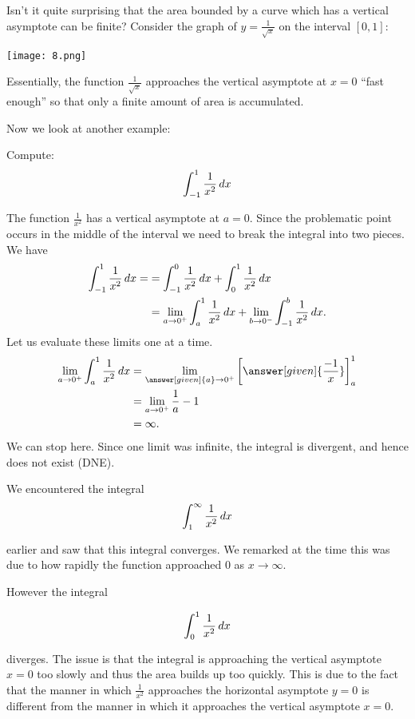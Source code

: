 \documentclass{ximera}
\begin{document}
\begin{example}
\begin{explanation}
Isn't it quite surprising that the area bounded by a curve which has a
vertical asymptote can be finite? Consider the graph of $y=
\frac{1}{\sqrt{x}}$ on the interval $[0,1]$:

\begin{image}
   \texttt{[image: 8.png]}
\end{image}

Essentially, the function $\frac{1}{\sqrt{x}}$ approaches the vertical asymptote at $x=0$ ``fast enough'' so that only a finite amount of area is accumulated. 

  \end{explanation}
\end{example}

Now we look at another example: 

\begin{example}	
  Compute:
  \[
  \int_{-1}^1 \frac{1}{x^2} \mathop{}\!d x
  \]
  \begin{explanation}
    The function $\frac{1}{x^2}$ has a vertical asymptote at $a=0$. Since the problematic point 
occurs in the middle of the interval we need to break the integral into two pieces.
  We have
\begin{align*}
  \int_{-1}^1 \frac{1}{x^2} \mathop{}\!d x =&= \int_{-1}^{0} \frac{1}{x^2} \mathop{}\!d x + \int_{0}^{1} \frac{1}{x^2} \mathop{}\!d x \\
&= \lim_{a \to 0^+} \int_{a}^1 \frac{1}{x^2} \mathop{}\!d x  + \lim_{b \to 0^-} \int_{-1}^{b} \frac{1}{x^2} \mathop{}\!d x.
 \end{align*}
  Let us evaluate these limits one at a time.
  \begin{align*}
    \lim_{a \to 0^+} \int_{a}^1 \frac{1}{x^2} \d x  &=  \lim_{\answer[given]{a} \to 0^+} \eval{\answer[given]{\frac{-1}{x}}}_a^1 \\
    &=  \lim_{a \to 0^+} \frac{1}{a}-1\\
    &= \infty.
  \end{align*}
    We can stop here. Since one limit was infinite, the integral is
    divergent, and hence does not exist (DNE). 
  \end{explanation}
\end{example}

\begin{remark}
We encountered the integral
\[
\int_{1}^{\infty} \frac{1}{x^2} \mathop{}\!d x 
\]

earlier and saw that this integral converges. We remarked at the time this was due to how rapidly the function approached $0$ as $x \to \infty$. 

However the integral

\[
\int_{0}^{1} \frac{1}{x^2} \mathop{}\!d x 
\]

diverges. The issue is that the integral is approaching the vertical asymptote $x=0$ too slowly and thus the area builds up too quickly. This is due to the fact that the manner in which $\frac{1}{x^2}$ approaches the horizontal asymptote $y=0$ is different from the manner in which 
it approaches the vertical asymptote $x=0$. 
\end{remark}
\end{document}
